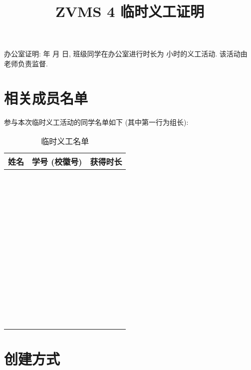 \documentclass{article}
\title{ZVMS 4 临时义工证明}
\date{}
\begin{document}
\maketitle

\underline{\hspace{4em}} 办公室证明: \underline{\hspace{4em}} 年 \underline{\hspace{2em}} 月 \underline{\hspace{2em}} 日, \underline{\hspace{4em}} 班级同学在办公室进行时长为 \underline{\hspace{4em}} 小时的义工活动. 该活动由 \underline{\hspace{4em}} 老师负责监督.

\section{相关成员名单}

参与本次临时义工活动的同学名单如下 (其中第一行为组长):

\begin{table}[H]
  \centering
  \begin{tabular}{|c|c|c|}
    \hline
    \textbf{\hspace{2em}姓名\hspace{2em}} & \textbf{\hspace{2em}学号 (校徽号)\hspace{2em}} & \textbf{\hspace{1em}获得时长\hspace{1em}} \\
    \hline
    ~&~&~\\\hline~&~&~\\\hline~&~&~\\\hline~&~&~\\\hline~&~&~\\\hline~&~&~\\\hline~&~&~\\\hline~&~&~\\\hline~&~&~\\\hline~&~&~\\\hline~&~&~\\
    \hline
  \end{tabular}
  \caption{临时义工名单}
\end{table}

\section{创建方式}
\end{document}
